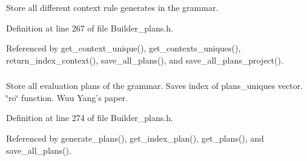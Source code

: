 \hypertarget{classgenevalmag_1_1Builder__plans_aac38711883bb0acd21483d2a918e0f0d}{
\subsubsection[{contexts\_\-uniques}]{}}
\label{classgenevalmag_1_1Builder__plans_aac38711883bb0acd21483d2a918e0f0d}


Store all different context rule generates in the grammar. 



Definition at line 267 of file Builder\_\-plans.h.



Referenced by get\_\-context\_\-unique(), get\_\-contexts\_\-uniques(), return\_\-index\_\-context(), save\_\-all\_\-plans(), and save\_\-all\_\-plans\_\-project().

\hypertarget{classgenevalmag_1_1Builder__plans_a02c97bab7b3561f4dde009b974255dfe}{
\subsubsection[{eval\_\-plans}]{}}
\label{classgenevalmag_1_1Builder__plans_a02c97bab7b3561f4dde009b974255dfe}


Store all evaluation plans of the grammar. Saves index of plans\_\-uniques vector. \char`\"{}ro\char`\"{} function. Wuu Yang's paper. 



Definition at line 274 of file Builder\_\-plans.h.



Referenced by generate\_\-plans(), get\_\-index\_\-plan(), get\_\-plans(), and save\_\-all\_\-plans().

\hypertarget{classgenevalmag_1_1Builder__plans_abe50c9e30276ceaeea344f6a95f23db8}{
\subsubsection[{init\_\-order\_\-ag}]{}}
\label{classgenevalmag_1_1Builder__plans_abe50c9e30276ceaeea344f6a95f23db8}


